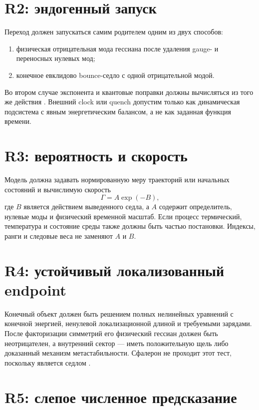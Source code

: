 \section{R2: эндогенный запуск}

Переход должен запускаться самим родителем одним из двух способов:
\begin{enumerate}
 \item физическая отрицательная мода гессиана после удаления gauge- и
 переносных нулевых мод;
 \item конечное евклидово bounce-седло с одной отрицательной модой.
\end{enumerate}
Во втором случае экспонента и квантовые поправки должны вычисляться из
того же действия \cite{new-model-coleman1977,new-model-callan-coleman1977}.
Внешний clock или quench допустим только как динамическая подсистема с
явным энергетическим балансом, а не как заданная функция времени.

\section{R3: вероятность и скорость}

Модель должна задавать нормированную меру траекторий или начальных
состояний и вычислимую скорость
\begin{equation}
 \Gamma=A\exp(-B),
\end{equation}
где $B$ является действием выведенного седла, а $A$ содержит определитель,
нулевые моды и физический временной масштаб. Если процесс термический,
температура и состояние среды также должны быть частью постановки.
Индексы, ранги и следовые веса не заменяют $A$ и $B$.

\section{R4: устойчивый локализованный endpoint}

Конечный объект должен быть решением полных нелинейных уравнений с конечной
энергией, ненулевой локализационной длиной и требуемыми зарядами. После
факторизации симметрий его физический гессиан должен быть неотрицателен,
а внутренний сектор --- иметь положительную щель либо доказанный механизм
метастабильности. Сфалерон не проходит этот тест, поскольку является
седлом \cite{new-model-klinkhamer-manton1984}.

\section{R5: слепое численное предсказание}

